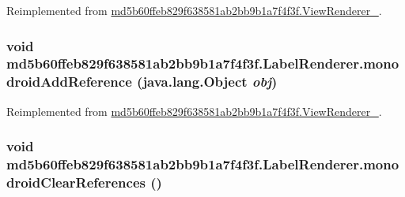 Reimplemented from \hyperlink{classmd5b60ffeb829f638581ab2bb9b1a7f4f3f_1_1_view_renderer__2_a0898cf56fa9a49b653470eaf1608e77}{md5b60ffeb829f638581ab2bb9b1a7f4f3f.ViewRenderer\_}.\hypertarget{classmd5b60ffeb829f638581ab2bb9b1a7f4f3f_1_1_label_renderer_5c75833e54cbdb93423612b6013f3ca2}{
\subsubsection[{monodroidAddReference}]{\setlength{\rightskip}{0pt plus 5cm}void md5b60ffeb829f638581ab2bb9b1a7f4f3f.LabelRenderer.monodroidAddReference (java.lang.Object {\em obj})}}
\label{classmd5b60ffeb829f638581ab2bb9b1a7f4f3f_1_1_label_renderer_5c75833e54cbdb93423612b6013f3ca2}




Reimplemented from \hyperlink{classmd5b60ffeb829f638581ab2bb9b1a7f4f3f_1_1_view_renderer__2_64ca8244a89f60a47c173d9c0b15d610}{md5b60ffeb829f638581ab2bb9b1a7f4f3f.ViewRenderer\_}.\hypertarget{classmd5b60ffeb829f638581ab2bb9b1a7f4f3f_1_1_label_renderer_8dd6dcc97dd63731d463ac57c6c6bf08}{
\subsubsection[{monodroidClearReferences}]{\setlength{\rightskip}{0pt plus 5cm}void md5b60ffeb829f638581ab2bb9b1a7f4f3f.LabelRenderer.monodroidClearReferences ()}}
\label{classmd5b60ffeb829f638581ab2bb9b1a7f4f3f_1_1_label_renderer_8dd6dcc97dd63731d463ac57c6c6bf08}




